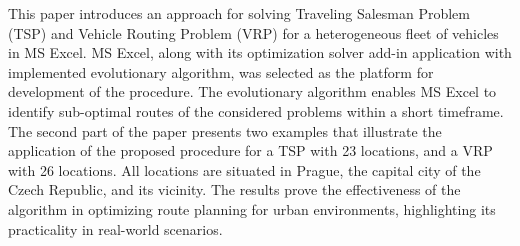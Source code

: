 
\begin{Abstrakt}
    This paper introduces an approach for solving Traveling Salesman Problem (TSP) and Vehicle Routing Problem (VRP) for a heterogeneous fleet of vehicles in MS Excel. MS Excel, along with its optimization solver add-in application with implemented evolutionary algorithm, was selected as the platform for development of the procedure. The evolutionary algorithm enables MS Excel to identify sub-optimal routes of the considered problems within a short timeframe. The second part of the paper presents two examples that illustrate the application of the proposed procedure for a TSP with 23 locations, and a VRP with 26 locations. All locations are situated in Prague, the capital city of the Czech Republic, and its vicinity. The results prove the effectiveness of the algorithm in optimizing route planning for urban environments, highlighting its practicality in real-world scenarios.
\end{Abstrakt}



\clearpage